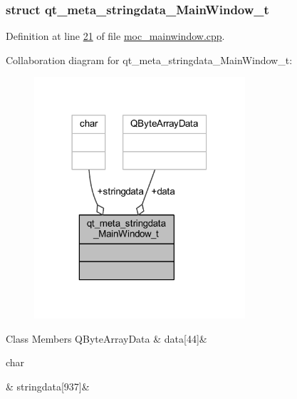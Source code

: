 \subsubsection{struct qt\+\_\+meta\+\_\+stringdata\+\_\+\+Main\+Window\+\_\+t}


Definition at line \hyperlink{a00015_source_l00021}{21} of file \hyperlink{a00015_source}{moc\+\_\+mainwindow.\+cpp}.



Collaboration diagram for qt\+\_\+meta\+\_\+stringdata\+\_\+\+Main\+Window\+\_\+t\+:
\nopagebreak
\begin{figure}[H]
\begin{center}
\leavevmode
\includegraphics[width=222pt]{db/ddf/a00164}
\end{center}
\end{figure}
\begin{DoxyFields}{Class Members}
\hypertarget{a00015_a3d0c7851e40263cf43b0979ebc8eed83}{Q\+Byte\+Array\+Data}\label{a00015_a3d0c7851e40263cf43b0979ebc8eed83}
&
data\mbox{[}44\mbox{]}&
\\
\hline

\hypertarget{a00015_aa581d4bebf76b40e9469596766315411}{char}\label{a00015_aa581d4bebf76b40e9469596766315411}
&
stringdata\mbox{[}937\mbox{]}&
\\
\hline

\end{DoxyFields}


